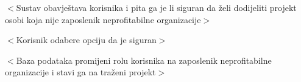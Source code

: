\begin{packed_item}
\begin{packed_item}
\begin{packed_enum}
								\item $<$Sustav obavještava korisnika i pita ga je li siguran da želi dodijeliti projekt
								osobi koja nije zaposlenik neprofitabilne organizacije$>$
								\item $<$Korisnik odabere opciju da je siguran$>$
								\item $<$Baza podataka promijeni rolu korisnika na zaposlenik neprofitabilne organizacije
								i stavi ga na traženi projekt$>$

							\end{packed_enum}

						\end{packed_item}
					\end{packed_item}

					\noindent {}
